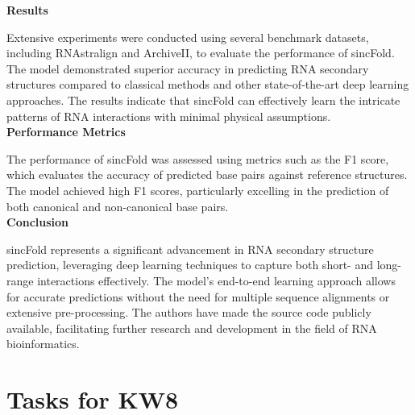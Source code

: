 \documentclass{article}
\begin{document}
\begin{large}
\begin{large}
\begin{large}
\textbf{Results}\par

Extensive experiments were conducted using several benchmark datasets, including RNAstralign and ArchiveII, to evaluate the performance of sincFold. The model demonstrated superior accuracy in predicting RNA secondary structures compared to classical methods and other state-of-the-art deep learning approaches. The results indicate that sincFold can effectively learn the intricate patterns of RNA interactions with minimal physical assumptions.\\[0.5em]

\textbf{Performance Metrics}\par

The performance of sincFold was assessed using metrics such as the F1 score, which evaluates the accuracy of predicted base pairs against reference structures. The model achieved high F1 scores, particularly excelling in the prediction of both canonical and non-canonical base pairs.\\[0.5em]

\textbf{Conclusion}\par

sincFold represents a significant advancement in RNA secondary structure prediction, leveraging deep learning techniques to capture both short- and long-range interactions effectively. The model's end-to-end learning approach allows for accurate predictions without the need for multiple sequence alignments or extensive pre-processing. The authors have made the source code publicly available, facilitating further research and development in the field of RNA bioinformatics.\\[0.5em]

\clearpage

\section{Tasks for KW8}


\end{large}
\end{large}
\end{large}
\end{document}
